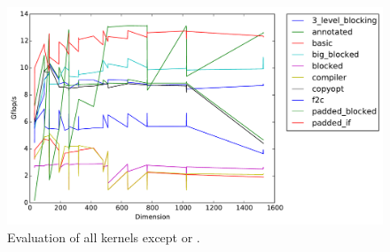 \begin{figure}[h]
  \centering
  \includegraphics[width=\textwidth]{img/timing_all_but_beast.pdf}
  \caption{Evaluation of all kernels except  or .}
  \label{fig:eval-all-but-beast}
\end{figure}
